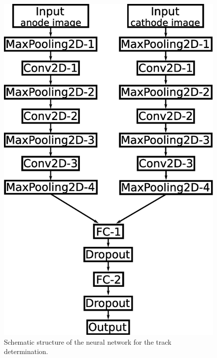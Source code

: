 \documentclass{jps-cp}
\begin{document}
\begin{figure}
\begin{minipage}{0.4\columnwidth}
    \includegraphics[clip, width=0.9\columnwidth]{eps/point_detection.eps}
    \caption{Schematic structure of the neural network for the track determination.}
    \label{fig:extraction}
  \end{minipage}
\end{figure}
\end{document}
